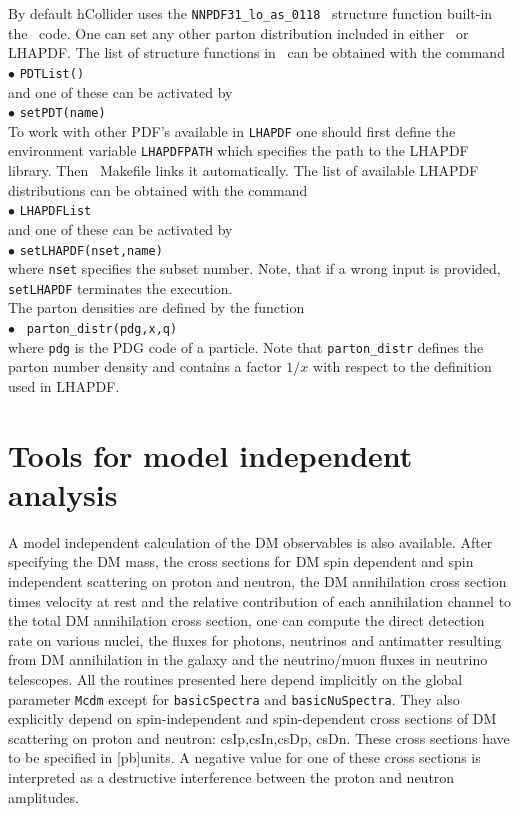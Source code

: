 \documentclass[12pt,a4paper]{article}
\begin{document}
By default hCollider uses the \verb|NNPDF31_lo_as_0118|~\cite{Ball:2017nwa} structure function built-in
the \micro\ code. One can set any other parton distribution included in
either \micro\ or LHAPDF.  The list  of structure functions in \micro\ can be
obtained with the command \\
$\bullet$ \verb|PDTList()| \\
and one of these can be activated by\\ 
$\bullet$ \verb|setPDT(name)|\\
To work with other PDF's available in {\tt LHAPDF}  one should first define the environment
variable {\tt LHAPDFPATH}  which specifies the path to the LHAPDF library. Then
\micro\ Makefile  links it automatically. The list of available LHAPDF
distributions can be obtained with the command\\
$\bullet$ \verb|LHAPDFList|\\
and one of these can be activated by \\
$\bullet$ \verb|setLHAPDF(nset,name)|\\
where {\tt nset} specifies the subset number. Note, that if a wrong input is provided, 
\verb|setLHAPDF| terminates the execution.\\[2mm]
%
\noindent
The parton densities are  defined  by the function \\
$\bullet$ \verb| parton_distr(pdg,x,q)|\\
where {\tt pdg} is the PDG code of a particle. Note that \verb|parton_distr| defines the parton number density and  
contains a factor $1/x$  with respect to the  definition used in LHAPDF.  

 
\section{Tools for model independent analysis}
\label{mdlIndep}

A model independent calculation of the DM observables is also available.
After specifying the DM mass, the cross sections for DM  spin dependent and  spin independent scattering on proton and neutron, the DM annihilation cross section times velocity at rest and the relative contribution of  each annihilation channel to the total DM annihilation cross section, one can compute the direct detection rate on   various nuclei, the fluxes for photons, neutrinos and antimatter resulting from DM annihilation in the galaxy and the neutrino/muon fluxes in neutrino telescopes.  
All the routines presented here 
depend implicitly on the  global parameter {\tt Mcdm} except for {\tt basicSpectra} and {\tt basicNuSpectra}.
They also explicitly depend on spin-independent and spin-dependent cross sections of DM scattering
on proton and neutron: csIp,csIn,csDp, csDn. These cross sections have to be specified in
[pb]units. A negative value for one of these cross sections is interpreted as a destructive 
interference between the proton and neutron amplitudes. 
\end{document}

